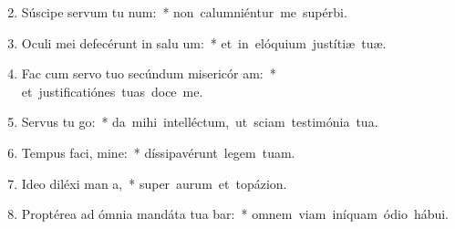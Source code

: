\begin{flushleft}
\begin{enumerate}[leftmargin=*]
\setcounter{enumi}{1}

\item Súscipe servum tu  num:~* \mbox{non calumniéntur me supérbi.}
\item Oculi mei defecérunt in salu um:~* \mbox{et in elóquium justítiæ tuæ.}
\item Fac cum servo tuo secúndum misericór am:~* \mbox{et justificatiónes tuas doce me.}
\item Servus tu  go:~* \mbox{da mihi intelléctum, ut sciam testimónia tua.}
\item Tempus faci, mine:~* \mbox{díssipavérunt legem tuam.}
\item Ideo diléxi man a,~* \mbox{super aurum et topázion.}
\item Proptérea ad ómnia mandáta tua bar:~* \mbox{omnem viam iníquam ódio hábui.}


\end{enumerate}
\end{flushleft}

